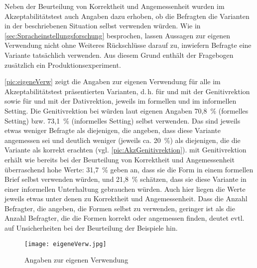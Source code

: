 Neben der Beurteilung von Korrektheit und Angemessenheit wurden im Akzeptabilitätstest auch Angaben dazu erhoben, ob die Befragten die Varianten in der beschriebenen Situation selbst verwenden würden. 
Wie in \autoref{sec:Spracheinstellungsforschung} besprochen, lassen Aussagen zur eigenen Verwendung nicht ohne Weiteres Rückschlüsse darauf zu, inwiefern Befragte eine Variante tatsächlich verwenden. 
Aus diesem Grund enthält der Fragebogen zusätzlich ein Produktionsexperiment.  

\autoref{pic:eigeneVerw} zeigt die Angaben zur eigenen Verwendung für alle im Akzeptabilitätstest präsentierten Varianten, d.\,h. für \dank{} und \gegenueber{} mit der Genitivrektion sowie für \wegen{} und \waehrend{} mit der Dativrektion, jeweils im formellen und im informellen Setting. 
Die Genitivrektion bei \dank{} würden laut eigenen Angaben 70,8~\% (formelles Setting) bzw. 73,1~\% (informelles Setting) selbst verwenden. 
Das sind jeweils etwas weniger Befragte als diejenigen, die angeben, dass diese Variante angemessen sei und deutlich weniger (jeweils ca. 20~\%) als diejenigen, die die Variante als korrekt erachten (vgl. \autoref{pic:AkzGenitivrektion}). 
 mit Genitivrektion erhält wie bereits bei der Beurteilung von Korrektheit und Angemessenheit überraschend hohe Werte: 
31,7~\% geben an, dass sie die Form in einem formellen Brief selbst verwenden würden, und 21,8~\% schätzen, dass sie diese Variante in einer informellen Unterhaltung gebrauchen würden. 
Auch hier liegen die Werte jeweils etwas unter denen zu Korrektheit und Angemessenheit. 
Dass die Anzahl Befragter, die angeben, die Formen selbst zu verwenden, geringer ist als die Anzahl Befragter, die die Formen korrekt oder angemessen finden, deutet evtl. auf Unsicherheiten bei der Beurteilung der Beispiele hin. 
\begin{figure}
\centering
\texttt{[image: eigeneVerw.jpg]}
\caption{Angaben zur eigenen Verwendung}
\label{pic:eigeneVerw}
\end{figure}

